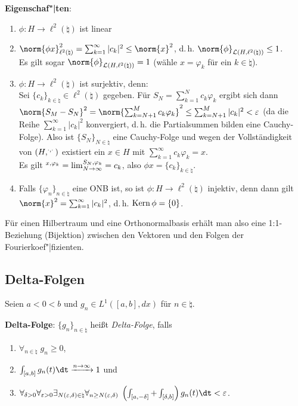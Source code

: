 \textbf{Eigenschaf"|ten}:
\begin{enumerate}
    \item
    $\phi\colon H \rightarrow \ell^2(\natural)$ ist linear
    
    \item
    $\norm{\phi x}_{\ell^2(\natural)}^2 =
    \sum_{k=1}^\infty |c_k|^2 \le \norm{x}^2$,
    d.\,h. $\norm{\phi}_{\L(H, \ell^2(\natural))} \le 1$.\\
    Es gilt sogar $\norm{\phi}_{\L(H, \ell^2(\natural))} = 1$
    (wähle $x = \varphi_k$ für ein $k \in \natural$).
    
    \item
    $\phi\colon H \rightarrow \ell^2(\natural)$ ist surjektiv, denn:\\
    Sei $\{c_k\}_{k \in \natural} \in \ell^2(\natural)$ gegeben.
    Für $S_N = \sum_{k=1}^N c_k \varphi_k$ ergibt sich dann\\
    $\norm{S_M - S_N}^2 = \norm{\sum_{k=N+1}^M c_k \varphi_k}^2 \le
    \sum_{k=N+1}^M |c_k|^2 < \varepsilon$
    (da die Reihe $\sum_{k=1}^\infty |c_k|^2$ konvergiert, d.\,h. die
    Partialsummen bilden eine Cauchy-Folge).
    Also ist $\{S_N\}_{N \in \natural}$ eine Cauchy-Folge und wegen der
    Vollständigkeit von $(H, \sp{\cdot, \cdot})$ existiert ein $x \in H$ mit
    $\sum_{k=1}^\infty c_k \varphi_k = x$.\\
    Es gilt $\sp{x, \varphi_k} =
    \lim_{N \to \infty} \sp{S_N, \varphi_k} = c_k$, also
    $\phi x = \{c_k\}_{k \in \natural}$.
    
    \item
    Falls $\{\varphi_n\}_{n \in \natural}$ eine ONB ist, so ist
    $\phi\colon H \rightarrow \ell^2(\natural)$ injektiv, denn dann gilt\\
    $\norm{x}^2 = \sum_{k=1}^\infty |c_k|^2$, d.\,h.
    $\operatorname{Kern} \phi = \{0\}$.
\end{enumerate}

Für einen Hilbertraum und eine Orthonormalbasis erhält man also eine
1:1-Beziehung (Bijektion) zwischen den Vektoren und den Folgen der
Fourierkoef"|fizienten.

\subsection{%
    Delta-Folgen%
}

Seien $a < 0 < b$ und $g_n \in L^1([a, b], dx)$ für $n \in \natural$.

\textbf{Delta-Folge}:
$\{g_n\}_{n \in \natural}$ heißt \emph{Delta-Folge}, falls
\begin{enumerate}
    \item
    $\forall_{n \in \natural}\; g_n \ge 0$,
    
    \item
    $\int_{[a, b]} g_n(t)\dt \xrightarrow{n \to \infty} 1$ und
    
    \item
    $\forall_{\delta > 0} \forall_{\varepsilon > 0}
    \exists_{N(\varepsilon, \delta) \in \natural}
    \forall_{n \ge N(\varepsilon, \delta)}\;
    \left(\int_{[a, -\delta]} + \int_{[\delta, b]}\right)
    g_n(t) \dt < \varepsilon$.
\end{enumerate}

